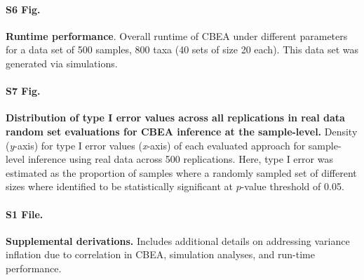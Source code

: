 \paragraph*{S6 Fig.}
\label{S6_Fig}
{\bf Runtime performance}. Overall runtime of CBEA under different parameters for a data set of 500 samples, 800 taxa (40 sets of size 20 each). This data set was generated via simulations.

\paragraph{S7 Fig.}
\label{S7_Fig}
{\bf Distribution of type I error values across all replications in real data random set evaluations for CBEA inference at the sample-level.} Density (\emph{y}-axis) for type I error values (\emph{x}-axis) of each evaluated approach for sample-level inference using real data across 500 replications. Here, type I error was estimated as the proportion of samples where a randomly sampled set of different sizes where identified to be statistically significant at $p$-value threshold of 0.05.  

\paragraph{S1 File.}
\label{S1_File}
{\bf Supplemental derivations.} Includes additional details on addressing variance inflation due to correlation in CBEA, simulation analyses, and run-time performance.

